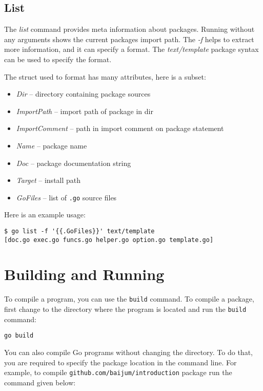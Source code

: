 \subsection{List}

The \textit{list} command provides meta information about packages.
Running without any arguments shows the current packages import path.
The \textit{-f} helps to extract more information, and it can specify
a format.  The \textit{text/template} package syntax can be used to
specify the format.

The struct used to format has many attributes, here is a subset:

\begin{itemize}
\item \textit{Dir} -- directory containing package sources
\item \textit{ImportPath} -- import path of package in dir
\item \textit{ImportComment} -- path in import comment on package statement
\item \textit{Name} -- package name
\item \textit{Doc} -- package documentation string
\item \textit{Target} -- install path
\item \textit{GoFiles} -- list of \texttt{.go} source files
\end{itemize}

Here is an example usage:

\begin{lstlisting}[numbers=none]
$ go list -f '{{.GoFiles}}' text/template
[doc.go exec.go funcs.go helper.go option.go template.go]
\end{lstlisting}

\section{Building and Running}

To compile a program, you can use the \texttt{build}
command.  To compile a package, first change to the
directory where the program is located and run the \texttt{build}
command:

\begin{lstlisting}[numbers=none]
go build
\end{lstlisting}

You can also compile Go programs without changing the directory.  To
do that, you are required to specify the package location in the
command line.  For example, to
compile \texttt{github.com/baijum/introduction} package run the
command given below:

